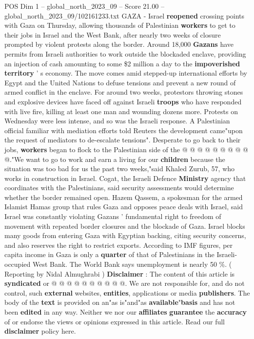 \begin{textsample}{POS Dim 1 – global\_north\_2023\_09 – Score 21.00 – global\_north\_2023\_09/102161233.txt}  \label{ex:f1_pos_351}
GAZA - Israel \textbf{reopened} crossing points with Gaza on Thursday, allowing thousands of Palestinian \textbf{workers} to get to their jobs in Israel and the West Bank, after nearly two weeks of closure prompted by violent protests along the border.
Around 18,000 \textbf{Gazans} have permits from Israeli authorities to work outside the blockaded enclave, providing an injection of cash amounting to some \$2 million a day to the \textbf{impoverished} \textbf{territory} ' s economy.
The move comes amid stepped-up international efforts by Egypt and the United Nations to defuse tensions and prevent a new round of armed conflict in the enclave.
For around two weeks, protestors throwing stones and explosive devices have faced off against Israeli \textbf{troops} who have responded with live fire, killing at least one man and wounding dozens more.
Protests on Wednesday were less intense, and so was the Israeli response.
A Palestinian official familiar with mediation efforts told Reuters the development came"upon the request of mediators to de-escalate tensions".
Desperate to go back to their jobs, \textbf{workers} began to flock to the Palestinian side of the @ @ @ @ @ @ @ @ @ @."We want to go to work and earn a living for our \textbf{children} because the situation was too bad for us the past two weeks,"said Khaled Zurub, 57, who works in construction in Israel.
Cogat, the Israeli Defence \textbf{Ministry} agency that coordinates with the Palestinians, said security assessments would determine whether the border remained open.
Hazem Qassem, a spokesman for the armed Islamist Hamas group that rules Gaza and opposes peace deals with Israel, said Israel was constantly violating Gazans ' fundamental right to freedom of movement with repeated border closures and the blockade of Gaza.
Israel blocks many goods from entering Gaza with Egyptian backing, citing security concerns, and also reserves the right to restrict exports.
According to IMF figures, per capita income in Gaza is only a \textbf{quarter} of that of Palestinians in the Israeli-occupied West Bank.
The World Bank says unemployment is nearly 50 \%. ( Reporting by Nidal Almughrabi ) \textbf{Disclaimer} : The content of this article is \textbf{syndicated} or @ @ @ @ @ @ @ @ @ @.
We are not responsible for, and do not control, such \textbf{external} websites, \textbf{entities}, applications or media \textbf{publishers}.
The body of the \textbf{text} is provided on an"as is"and"as \textbf{available}"\textbf{basis} and has not been \textbf{edited} in any way.
Neither we nor our \textbf{affiliates} \textbf{guarantee} the \textbf{accuracy} of or endorse the views or opinions expressed in this article.
Read our full \textbf{disclaimer} policy here.

\end{textsample}
